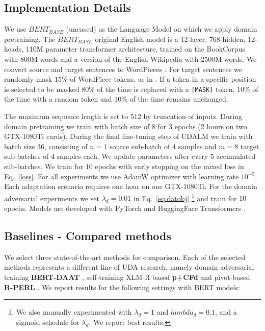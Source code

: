 \documentclass[11pt]{article}
\begin{document}
\subsection{Implementation Details}

We use \(BERT_{BASE}\) (uncased) as the Language Model on which we apply domain pretraining. The \(BERT_{BASE}\) original English model is a 12-layer, 768-hidden, 12-heads, 110M parameter transformer architecture, trained on the BookCorpus with 800M words and a version of the English Wikipedia with 2500M words.
We convert source and target sentences to WordPieces \citep{wu2016google}. For target sentences we randomly mask \(15\%\) of WordPiece tokens, as in \citep{devlin-etal-2019-bert}. If a token in a specific position is selected to be masked \(80\%\) of the time is replaced with a \texttt{[MASK]} token, \(10\%\) of the time with a random token and \(10\%\) of the time remains unchanged.

The maximum sequence length is set to 512 by truncation of inputs. During domain pretraining we train with batch size of 8 for 3 epochs (2 hours on two GTX-1080Ti cards).   
During the final fine-tuning step of UDALM we train with batch size 36, consisting of $n=1$ source sub-batch of $4$ samples and $m=8$ target sub-batches of $4$ samples each.
We update parameters after every $5$ accumulated sub-batches. We train for $10$ epochs with early stopping on the mixed loss in Eq.~\ref{loss}. 
For all experiments we use AdamW optimizer \cite{loshchilov2018decoupled} with learning rate $10^{-5}$.
Each adaptation scenario requires one hour on one GTX-1080Ti.
For the domain adversarial experiments we set  \(\lambda_{d}=0.01\) in Eq.~\ref{eq:datobj} \footnote{We also manually experimented with $\lambda_d=1$ and $lambda_d=0.1$, and a sigmoid schedule for \(\lambda_{d}\). We report best results.} and train for $10$ epochs.
Models are developed with PyTorch \citep{pytorch} and HuggingFace Transformers \citep{wolf2019huggingface}.

\subsection{Baselines - Compared methods}

We select three state-of-the-art methods for comparison. Each of the selected methods represents a different line of UDA research, namely domain adversarial training \textbf{BERT-DAAT} \citep{du-etal-2020-adversarial}, self-training XLM-R based \textbf{p+CFd} \citep{ye_feature_2020} and pivot-based \textbf{R-PERL} \citep{ben2020perl}.
We report results for the following settings with BERT models:
\end{document}

